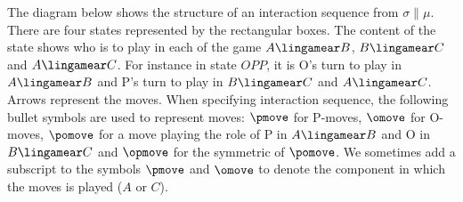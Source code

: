 The diagram below shows the structure of an interaction sequence
from $\sigma \parallel \mu$. There are four states represented by
the rectangular boxes. The content of the state shows who is to play
in each of the game $A\lingamear B$, $B\lingamear C$ and
$A\lingamear C$. For instance in state $OPP$, it is O's turn to play
in $A\lingamear B$ and P's turn to play in $B\lingamear C$ and
$A\lingamear C$. Arrows represent the moves. When specifying
interaction sequence, the following bullet symbols are used to
represent moves: $\pmove$ for P-moves, $\omove$ for O-moves,
$\pomove$ for a move playing the role of P in $A\lingamear B$ and O
in $B\lingamear C$ and $\opmove$ for the symmetric of $\pomove$. We
sometimes add a subscript to the symbols $\pmove$ and $\omove$ to
denote the component in which the moves is played ($A$ or $C$).


